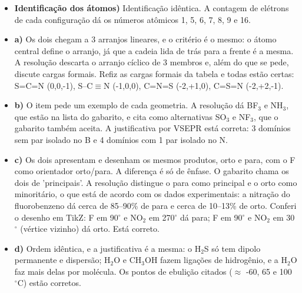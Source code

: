 \documentclass{article}%
\begin{document}
\begin{itemize}%
\item%
\textbf{Identificação dos átomos)} Identificação idêntica. A contagem de elétrons de cada configuração dá os números atômicos 1, 5, 6, 7, 8, 9 e 16.%
\item%
\textbf{a)} Os dois chegam a 3 arranjos lineares, e o critério é o mesmo: o átomo central define o arranjo, já que a cadeia lida de trás para a frente é a mesma. A resolução descarta o arranjo cíclico de 3 membros e, além do que se pede, discute cargas formais. Refiz as cargas formais da tabela e todas estão certas: S=C=N (0,0,-1), S--C$\equiv$N (-1,0,0), C=N=S (-2,+1,0), C=S=N (-2,+2,-1).%
\item%
\textbf{b)} O item pede um exemplo de cada geometria. A resolução dá BF$_{3}$ e NH$_{3}$, que estão na lista do gabarito, e cita como alternativas SO$_{3}$ e NF$_{3}$, que o gabarito também aceita. A justificativa por VSEPR está correta: 3 domínios sem par isolado no B e 4 domínios com 1 par isolado no N.%
\item%
\textbf{c)} Os dois apresentam e desenham os mesmos produtos, orto e para, com o F como orientador orto/para. A diferença é só de ênfase. O gabarito chama os dois de 'principais'. A resolução distingue o para como principal e o orto como minoritário, o que está de acordo com os dados experimentais: a nitração do fluorobenzeno dá cerca de 85--90\% de para e cerca de 10--13\% de orto. Conferi o desenho em TikZ: F em 90$^\circ$ e NO$_{2}$ em 270$^\circ$ dá para; F em 90$^\circ$ e NO$_{2}$ em 30$^\circ$ (vértice vizinho) dá orto. Está correto.%
\item%
\textbf{d)} Ordem idêntica, e a justificativa é a mesma: o H$_{2}$S só tem dipolo permanente e dispersão; H$_{2}$O e CH$_{3}$OH fazem ligações de hidrogênio, e a H$_{2}$O faz mais delas por molécula. Os pontos de ebulição citados ($\approx$ -60, 65 e 100 $^\circ$C) estão corretos.%
\end{itemize}%
\end{document}

